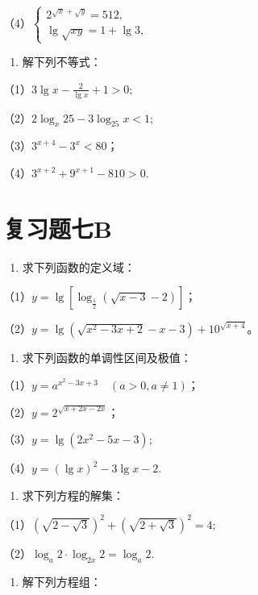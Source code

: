 （4）\(\left\{ \begin{array}{l} 2^{\sqrt{x} + \sqrt{y}} = 512, \\ \lg \sqrt{x y} = 1 + \lg 3, \end{array} \right.\)

\begin{enumerate}[start=12]
\item
  解下列不等式：
\end{enumerate}

（1）\(3\lg x - \frac{2}{\lg x} + 1 > 0;\)

（2）\(2\log_{x}25 - 3\log_{25}x < 1;\)

（3）\(3^{x + 4} - 3^x < 80\)；

（4）\(3^{x + 2} + 9^{x + 1} - 810 > 0.\)

\section{复习题七B}

\begin{enumerate}
\item
  求下列函数的定义域：
\end{enumerate}

（1）\(y = \lg [\log_{\frac{1}{2}}(\sqrt{x - 3} - 2)]\)；

（2）\(y = \lg (\sqrt{x^2 - 3x + 2} - x - 3) + 10^{\sqrt{x + 4}}\)。

\begin{enumerate}[start=2]
\item
  求下列函数的单调性区间及极值：
\end{enumerate}

（1）\(y = a^{x^2 - 3x + 3} \quad (a > 0, a \neq 1)\)；

（2）\(y = 2^{\sqrt{x + 2x - 2x}}\)；

（3）\(y = \lg (2x^2 - 5x - 3);\)

（4）\(y = (\lg x)^2 - 3\lg x - 2.\)

\begin{enumerate}[start=3]
\item
  求下列方程的解集：
\end{enumerate}

（1）\((\sqrt{2 - \sqrt{3}})^2 + (\sqrt{2 + \sqrt{3}})^2 = 4;\)

（2）\(\log_{a} 2 \cdot \log_{2x} 2 = \log_{a} 2.\)

\begin{enumerate}[start=4]
\item
  解下列方程组：
\end{enumerate}

